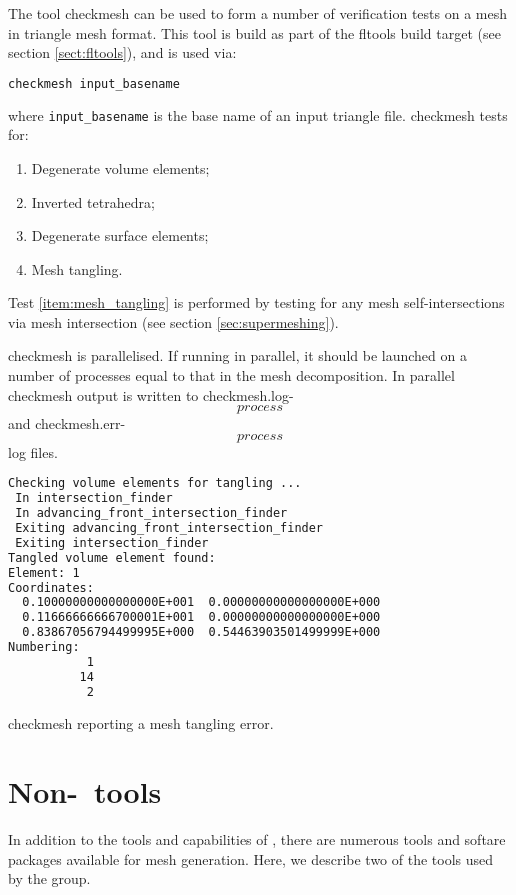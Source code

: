 The tool checkmesh can be used to form a number of verification tests on a mesh
in triangle mesh format. This tool is build as part of the fltools build target
(see section \ref{sect:fltools}), and is used via:

\begin{lstlisting}[language = Bash]
checkmesh input_basename
\end{lstlisting}

where \lstinline[language = Bash]*input_basename* is the base name of an input
triangle file. checkmesh tests for:

\begin{enumerate}
  \item Degenerate volume elements;
  \item Inverted tetrahedra;
  \item Degenerate surface elements;
  \item\label{item:mesh_tangling} Mesh tangling.
\end{enumerate}

Test \ref{item:mesh_tangling} is performed by testing for any mesh self-intersections
via mesh intersection (see section \ref{sec:supermeshing}).

checkmesh is parallelised. If running in parallel, it should be launched on a number
of processes equal to that in the mesh decomposition. In parallel checkmesh output
is written to checkmesh.log-\[process\] and checkmesh.err-\[process\] log files.

\begin{example}
\begin{lstlisting}[language = Bash]
Checking volume elements for tangling ...
 In intersection_finder
 In advancing_front_intersection_finder
 Exiting advancing_front_intersection_finder
 Exiting intersection_finder
Tangled volume element found: 
Element: 1
Coordinates:
  0.10000000000000000E+001  0.00000000000000000E+000
  0.11666666666700001E+001  0.00000000000000000E+000
  0.83867056794499995E+000  0.54463903501499999E+000
Numbering:
           1
          14
           2
\end{lstlisting}
\caption{checkmesh reporting a mesh tangling error.}
\end{example}

\section{Non-\fluidity\ tools}

In addition to the tools and capabilities of \fluidity, there are numerous
tools and softare packages available for mesh generation. Here, we describe 
two of the tools used by the group.

